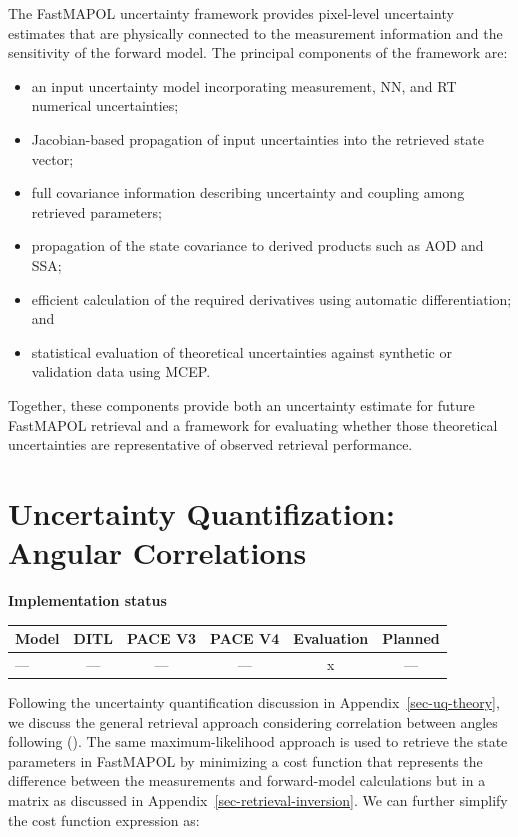 \documentclass[
  11pt,
  letterpaper,
]{scrreprt}
\providecommand{\tightlist}{%
  \setlength{\itemsep}{0pt}\setlength{\parskip}{0pt}}
\begin{document}
The FastMAPOL uncertainty framework provides pixel-level uncertainty
estimates that are physically connected to the measurement information
and the sensitivity of the forward model. The principal components of
the framework are:

\begin{itemize}
\tightlist
\item
  an input uncertainty model incorporating measurement, NN, and RT
  numerical uncertainties;
\item
  Jacobian-based propagation of input uncertainties into the retrieved
  state vector;
\item
  full covariance information describing uncertainty and coupling among
  retrieved parameters;
\item
  propagation of the state covariance to derived products such as AOD
  and SSA;
\item
  efficient calculation of the required derivatives using automatic
  differentiation; and
\item
  statistical evaluation of theoretical uncertainties against synthetic
  or validation data using MCEP.
\end{itemize}

Together, these components provide both an uncertainty estimate for
future FastMAPOL retrieval and a framework for evaluating whether those
theoretical uncertainties are representative of observed retrieval
performance.

\chapter{Uncertainty Quantifization: Angular
Correlations}\label{sec-uq-correlation}

\textbf{Implementation status}

\begin{longtable}[]{@{}lccccc@{}}
\toprule\noalign{}
Model & DITL & PACE V3 & PACE V4 & Evaluation & Planned \\
\midrule\noalign{}
\endhead
\bottomrule\noalign{}
\endlastfoot
--- & --- & --- & --- & x & --- \\
\end{longtable}

Following the uncertainty quantification discussion in
Appendix~\ref{sec-uq-theory}, we discuss the general retrieval approach
considering correlation between angles following
(). The same
maximum-likelihood approach is used to retrieve the state parameters in
FastMAPOL by minimizing a cost function that represents the difference
between the measurements and forward-model calculations but in a matrix
as discussed in Appendix~\ref{sec-retrieval-inversion}. We can further
simplify the cost function expression as:
\end{document}
